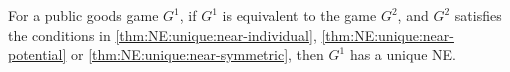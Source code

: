 \begin{corollary}
\label{cor:NE:unique:equivalence}
For a public goods game $G^1$, if $G^1$ is equivalent to the  game $G^2$, and $G^2$ satisfies the conditions in \cref{thm:NE:unique:near-individual}, \cref{thm:NE:unique:near-potential} or \cref{thm:NE:unique:near-symmetric}, then $G^1$ has a unique NE.
\end{corollary}